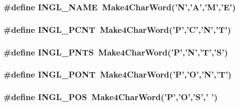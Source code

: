 \hypertarget{a00216_a8c3df43b9069c1020caaaf5b08f23f6e}{
\subsubsection[{I\-N\-G\-L\-\_\-\-N\-A\-M\-E}]{\setlength{\rightskip}{0pt plus 5cm}\#define I\-N\-G\-L\-\_\-\-N\-A\-M\-E~{\bf Make4\-Char\-Word}('N','A','M','E')}}\label{a00216_a8c3df43b9069c1020caaaf5b08f23f6e}
\hypertarget{a00216_ad0cf4482471640f338aa9f5cce8b8c75}{
\subsubsection[{I\-N\-G\-L\-\_\-\-P\-C\-N\-T}]{\setlength{\rightskip}{0pt plus 5cm}\#define I\-N\-G\-L\-\_\-\-P\-C\-N\-T~{\bf Make4\-Char\-Word}('P','C','N','T')}}\label{a00216_ad0cf4482471640f338aa9f5cce8b8c75}
\hypertarget{a00216_a2a62f4e60b3f367ce1915d26a2e23415}{
\subsubsection[{I\-N\-G\-L\-\_\-\-P\-N\-T\-S}]{\setlength{\rightskip}{0pt plus 5cm}\#define I\-N\-G\-L\-\_\-\-P\-N\-T\-S~{\bf Make4\-Char\-Word}('P','N','T','S')}}\label{a00216_a2a62f4e60b3f367ce1915d26a2e23415}
\hypertarget{a00216_add1147c2420b24916d743977b037c3a8}{
\subsubsection[{I\-N\-G\-L\-\_\-\-P\-O\-N\-T}]{\setlength{\rightskip}{0pt plus 5cm}\#define I\-N\-G\-L\-\_\-\-P\-O\-N\-T~{\bf Make4\-Char\-Word}('P','O','N','T')}}\label{a00216_add1147c2420b24916d743977b037c3a8}
\hypertarget{a00216_abbe03e4e92b29501dd77daed443b5530}{
\subsubsection[{I\-N\-G\-L\-\_\-\-P\-O\-S}]{\setlength{\rightskip}{0pt plus 5cm}\#define I\-N\-G\-L\-\_\-\-P\-O\-S~{\bf Make4\-Char\-Word}('P','O','S',' ')}}\label{a00216_abbe03e4e92b29501dd77daed443b5530}
